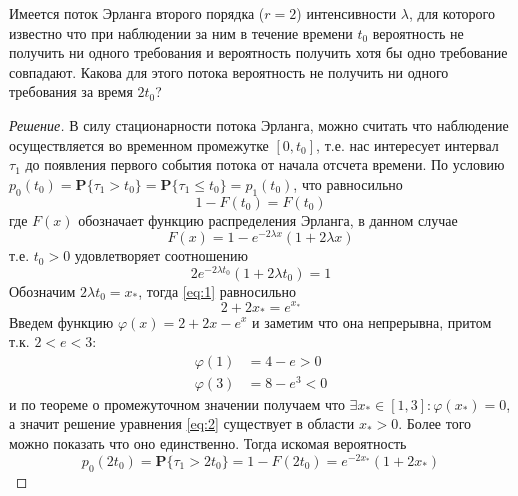 \documentclass[12pt,a4paper]{article}
\author{Самутичев Е.Р.}
\date{\today}
\title{}
\newcommand{\pP}{\mathbf{P}}
\begin{document}
	
\maketitle

\begin{exercise}[Задача 5]
	Имеется поток Эрланга второго порядка ($r = 2$) интенсивности $\lambda$, для которого известно что при наблюдении за ним в течение времени $t_0$ вероятность не получить ни одного требования и вероятность получить хотя бы одно требование совпадают. Какова для этого потока вероятность не получить ни одного требования за время $2t_0$?
\end{exercise}
\begin{proof}[Решение]
	В силу стационарности потока Эрланга, можно считать что наблюдение осуществляется во временном промежутке $[0, t_0]$, т.е. нас интересует интервал $\tau_1$ до появления первого события потока от начала отсчета времени. По условию $p_0 (t_0) = \pP\{\tau_1 > t_0\} = \pP\{\tau_1 \leq t_0\} = p_1 (t_0)$, что равносильно
	$$1 - F(t_0) = F(t_0)$$
	где $F(x)$ обозначает функцию распределения Эрланга, в данном случае
	$$F(x) = 1 - e^{-2\lambda x} (1 + 2\lambda x)$$
	т.е. $t_0 > 0$ удовлетворяет соотношению
	\begin{equation}\label{eq:1}
		2e^{-2\lambda t_0} (1 + 2\lambda t_0) = 1
	\end{equation}
	Обозначим $2\lambda t_0 = x_*$, тогда \eqref{eq:1} равносильно
	\begin{equation}\label{eq:2}
		2 + 2x_* = e^{x_*}
	\end{equation}
	Введем функцию $\varphi(x) = 2 + 2x - e^x$ и заметим что она непрерывна, притом т.к. $2 < e < 3$:
	\begin{align*}
		\varphi(1) &= 4 - e > 0 \\
		\varphi(3) &= 8 - e^3 < 0
	\end{align*}
	и по теореме о промежуточном значении получаем что $\exists x_* \in [1, 3]: \varphi(x_*) = 0$, а значит решение уравнения \eqref{eq:2} существует в области $x_* > 0$. Более того можно показать что оно единственно. Тогда искомая вероятность
	$$p_0 (2t_0) = \pP\{\tau_1 > 2t_0\} = 1 - F(2t_0) = e^{-2x_*} (1 + 2x_*)$$
\end{proof}
\end{document}
